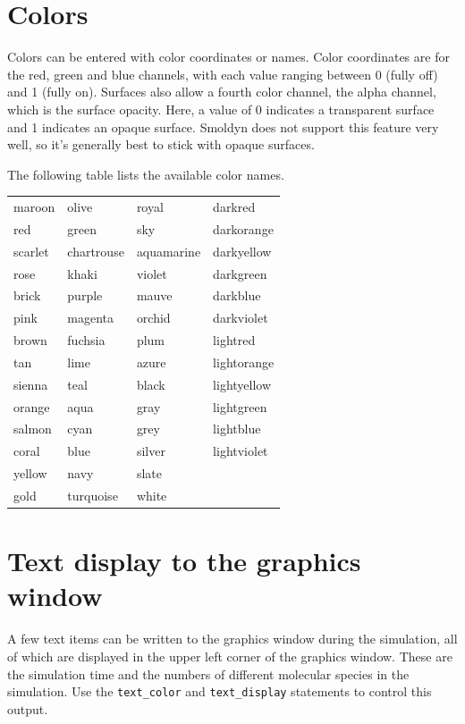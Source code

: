 \documentclass {book}
\newcommand {\ttt} {\texttt}
\begin{document}
\section{Colors}

Colors can be entered with color coordinates or names. Color coordinates are for the red, green and blue channels, with each value ranging between 0 (fully off) and 1 (fully on). Surfaces also allow a fourth color channel, the alpha channel, which is the surface opacity. Here, a value of 0 indicates a transparent surface and 1 indicates an opaque surface. Smoldyn does not support this feature very well, so it's generally best to stick with opaque surfaces.

The following table lists the available color names.

\begin{longtable}[c]{llll}
maroon & olive & royal & darkred\\
red & green & sky & darkorange\\
scarlet & chartrouse & aquamarine & darkyellow\\
rose & khaki & violet & darkgreen\\
brick & purple & mauve & darkblue\\
pink & magenta & orchid & darkviolet\\
brown & fuchsia & plum & lightred\\
tan & lime & azure & lightorange\\
sienna & teal & black & lightyellow\\
orange & aqua & gray & lightgreen\\
salmon & cyan & grey & lightblue\\
coral & blue & silver & lightviolet\\
yellow & navy & slate\\
gold & turquoise & white\\
\end{longtable}

\section{Text display to the graphics window}

A few text items can be written to the graphics window during the simulation, all of which are displayed in the upper left corner of the graphics window. These are the simulation time and the numbers of different molecular species in the simulation. Use the \ttt{text\_color} and \ttt{text\_display} statements to control this output.
\end{document}
